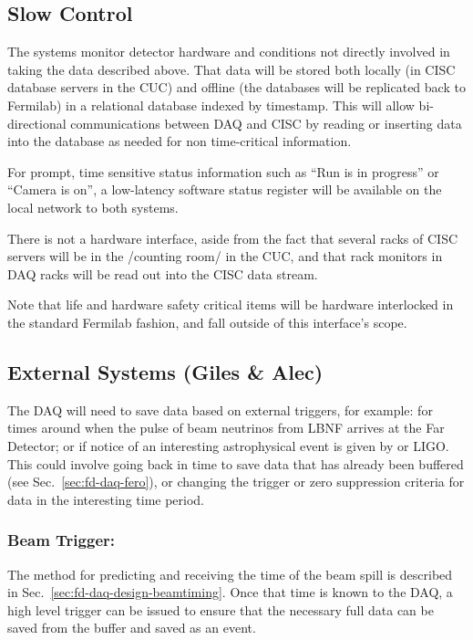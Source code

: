 \subsection{Slow Control}
\label{sec:fd-daq-intfc-sc}
\label{sec:fd-daq-intfc-sc}

The  systems monitor detector hardware and conditions not
directly involved in taking the data described above.
That data will be stored both locally (in CISC database servers in the
CUC) and offline (the databases will be replicated back to Fermilab)
in a relational database indexed by timestamp.
This will allow bi-directional communications between DAQ and CISC by
reading or inserting data into the database as needed for non
time-critical information.  

For prompt, time sensitive status information such as ``Run is in
progress'' or ``Camera is on'', a low-latency software status register
will be available on the local network to both systems.

There is not a hardware interface, aside from the fact that several
racks of CISC servers will be in the /counting room/ in the CUC, and that rack
monitors in DAQ racks will be read out into the CISC data stream.

Note that life and hardware safety critical items will be hardware
interlocked in the standard Fermilab fashion, and fall outside of this
interface's scope.


\subsection{External Systems (Giles \& Alec)}
\label{sec:fd-daq-intfc-ext}


The DAQ will need to save data based on external triggers, for
example: for times around when the pulse of beam neutrinos from LBNF
arrives at the Far Detector; or if notice of an interesting
astrophysical event is given by \cite{snews} or LIGO.
This could involve going back in time to save data that has already
been buffered (see Sec.~\ref{sec:fd-daq-fero}), or changing the trigger
or zero suppression criteria for data in the interesting time period.

\subsubsection{Beam Trigger:} The method for predicting and receiving the
time of the beam spill is described in
Sec.~\ref{sec:fd-daq-design-beamtiming}.
Once that time is known to the DAQ, a high level trigger can be issued
to ensure that the necessary full data can be saved from the buffer
and saved as an event.

